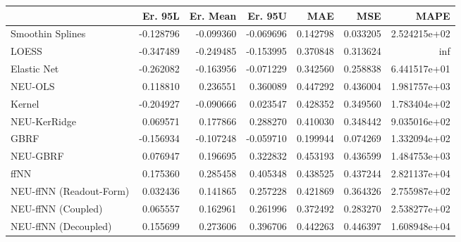 \begin{tabular}{lrrrrrr}
\toprule
{} &   Er. 95L &  Er. Mean &   Er. 95U &       MAE &       MSE &          MAPE \\
\midrule
Smoothin Splines        & -0.128796 & -0.099360 & -0.069696 &  0.142798 &  0.033205 &  2.524215e+02 \\
LOESS                   & -0.347489 & -0.249485 & -0.153995 &  0.370848 &  0.313624 &           inf \\
Elastic Net             & -0.262082 & -0.163956 & -0.071229 &  0.342560 &  0.258838 &  6.441517e+01 \\
NEU-OLS                 &  0.118810 &  0.236551 &  0.360089 &  0.447292 &  0.436004 &  1.981757e+03 \\
Kernel                  & -0.204927 & -0.090666 &  0.023547 &  0.428352 &  0.349560 &  1.783404e+02 \\
NEU-KerRidge            &  0.069571 &  0.177866 &  0.288270 &  0.410030 &  0.348442 &  9.035016e+02 \\
GBRF                    & -0.156934 & -0.107248 & -0.059710 &  0.199944 &  0.074269 &  1.332094e+02 \\
NEU-GBRF                &  0.076947 &  0.196695 &  0.322832 &  0.453193 &  0.436599 &  1.484753e+03 \\
ffNN                    &  0.175360 &  0.285458 &  0.405348 &  0.438525 &  0.437244 &  2.821137e+04 \\
NEU-ffNN (Readout-Form) &  0.032436 &  0.141865 &  0.257228 &  0.421869 &  0.364326 &  2.755987e+02 \\
NEU-ffNN (Coupled)      &  0.065557 &  0.162961 &  0.261996 &  0.372492 &  0.283270 &  2.538277e+02 \\
NEU-ffNN (Decoupled)    &  0.155699 &  0.273606 &  0.396706 &  0.442263 &  0.446397 &  1.608948e+04 \\
\bottomrule
\end{tabular}
